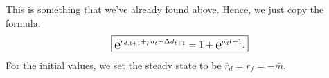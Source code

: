 	This is something that we've already found above. Hence, we just copy the formula:
\begin{equation}
	\boxed{\e{r_{d,t+1} + pd_{t} - \Delta d_{t+1}} = 1 + \e{p_d{t+1}}.}
\end{equation}
For the initial values, we set the steady state to be $\bar{r}_d = r_f = -\bar{m}$.